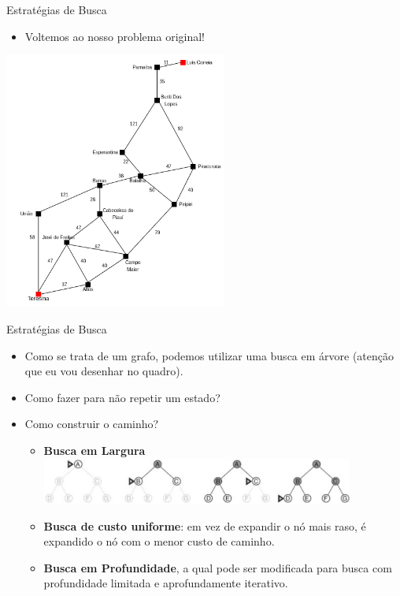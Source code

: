 \documentclass{libs/ufc_format}
\begin{document}
\begin{frame}{Estratégias de Busca}
    \begin{itemize}
        \item Voltemos ao nosso problema original!
    \end{itemize}
    \centering
    \includegraphics[width=0.55\textwidth]{figuras/problema01}
\end{frame}

\begin{frame}{Estratégias de Busca}
    \begin{itemize}
        \justifying
        \item Como se trata de um grafo, podemos utilizar uma busca em árvore (atenção que eu vou desenhar no quadro).
        \item<2-> Como fazer para não repetir um estado?
        \item<3-> Como construir o caminho?
            \begin{itemize}
                \item<4> \textbf{Busca em Largura}\\
                \includegraphics[width=0.85\textwidth]{figuras/figura10}
                \item<4> \textbf{Busca de custo uniforme}: em vez de expandir o nó mais raso, é expandido o nó com o menor custo de caminho.
                \item<4> \textbf{Busca em Profundidade}, a qual pode ser modificada para busca com profundidade limitada e aprofundamente iterativo.
            \end{itemize}
    \end{itemize}
\end{frame}
\end{document}
